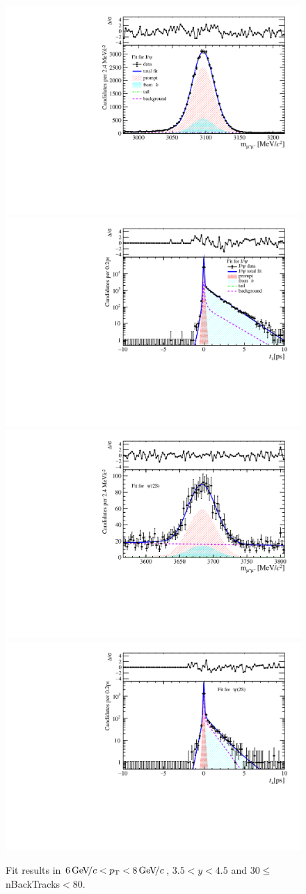\begin{figure}[H]
\begin{center}
\includegraphics[width=0.47\linewidth]{pdf/Jpsi/drawmassB/n5y3pt4.pdf}
\includegraphics[width=0.47\linewidth]{pdf/Jpsi/2DFitB/n5y3pt4.pdf}
\vspace*{-0.5cm}
\includegraphics[width=0.47\linewidth]{pdf/Psi2S/drawmassB/n5y3pt4.pdf}
\includegraphics[width=0.47\linewidth]{pdf/Psi2S/2DFitB/n5y3pt4.pdf}
\vspace*{-0.5cm}
\end{center}
\caption{Fit results in $6\text{\,Ge\kern -0.1em V\!/}c<p_{\mathrm{T}}<8\text{\,Ge\kern -0.1em V\!/}c$, $3.5<y<4.5$ and 30$\leq$nBackTracks$<$80.}
\label{Fitn5y3pt4}
\end{figure}
